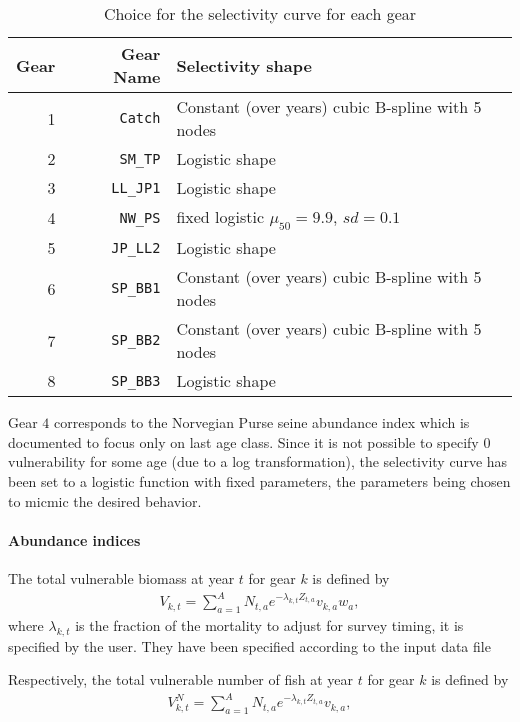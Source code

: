 \begin{table}[ht]
\centering
\begin{tabular}{rrp{8cm}}
  \hline
  Gear & Gear Name & Selectivity shape \\ 
  \hline
1 & \verb+Catch+ & Constant (over years) cubic B-spline with 5 nodes \\
2 & \verb+SM_TP+ & Logistic shape \\ 	
3 & \verb+LL_JP1+ & Logistic shape \\
4 & \verb+NW_PS+ & fixed logistic $\mu_{50}=9.9$, $sd=0.1$\\
5 & \verb+JP_LL2+ & Logistic shape \\
6 & \verb+SP_BB1+ & Constant (over years) cubic B-spline with 5 nodes \\
7 & \verb+SP_BB2+ & Constant (over years) cubic B-spline with 5 nodes \\
8 & \verb+SP_BB3+ & Logistic shape \\
\hline
\end{tabular}
\caption{Choice for the selectivity curve for each gear}
\label{table:selectivity}
\end{table}


Gear  $4$ corresponds  to the  Norvegian Purse  seine abundance  index
which is documented  to focus  only on  last age  class. Since  it is  not possible  to
specify $0$ vulnerability for some  age (due to a log transformation),
the selectivity curve  has been set to a logistic  function with fixed
parameters, the parameters being chosen to micmic the desired behavior.


\paragraph{Abundance indices}



The total vulnerable biomass at year $t$ for gear $k$ is defined by
\begin{gather}
V_{k,t}=\sum_{a=1}^A N_{t,a} e^{-\lambda_{k,t} Z_{t,a}} v_{k,a} w_a,
\end{gather}
 where $\lambda_{k,t}$ is the fraction  of the mortality to adjust for
 survey timing, it is specified by the user. They have been
 specified according to the input data file 
 
Respectively, the total vulnerable number of fish at year $t$ for gear $k$ is defined by
\begin{gather}
V^{N}_{k,t}=\sum_{a=1}^A N_{t,a} e^{-\lambda_{k,t} Z_{t,a}} v_{k,a},
\end{gather}
 

